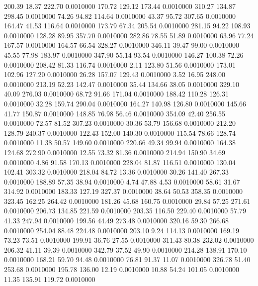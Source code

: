  200.39   18.37  222.70   0.0010000
 170.72  129.12  173.44   0.0010000
 310.27  134.87  298.45   0.0010000
  74.26   94.82  114.64   0.0010000
  43.37   95.72  307.65   0.0010000
 164.47   41.53  116.64   0.0010000
 173.79   67.34  205.54   0.0010000
 281.15   94.22  108.93   0.0010000
 128.28   89.95  357.70   0.0010000
 282.86   78.55   51.89   0.0010000
  63.96   77.24  167.57   0.0010000
 164.57   66.54  328.27   0.0010000
 346.11   39.47   99.00   0.0010000
  45.55   77.98  183.97   0.0010000
 347.90   55.14   93.54   0.0010000
 146.27  100.38   72.26   0.0010000
 208.42   81.33  116.74   0.0010000
   2.11  123.80   51.56   0.0010000
 173.01  102.96  127.20   0.0010000
  26.28  157.07  129.43   0.0010000
   3.52   16.95  248.00   0.0010000
 213.19   52.23  142.47   0.0010000
  35.44  134.66   38.05   0.0010000
 329.10   40.09  276.03   0.0010000
  68.72   91.66  171.04   0.0010000
 188.42  110.28  126.31   0.0010000
  32.28  159.74  290.04   0.0010000
 164.27  140.98  126.80   0.0010000
 145.66   41.77  150.87   0.0010000
 148.85   76.98   56.46   0.0010000
 354.09   42.40  256.55   0.0010000
  72.57   81.52  307.23   0.0010000
  30.36   53.79  156.68   0.0010000
 212.20  128.79  240.37   0.0010000
 122.43  152.00  140.30   0.0010000
 115.54   78.66  128.74   0.0010000
  11.38   50.57  149.60   0.0010000
 220.66   49.34   99.94   0.0010000
 164.38  124.68  272.90   0.0010000
  12.55   73.32   81.36   0.0010000
 214.94  150.90   34.69   0.0010000
   4.86   91.58  170.13   0.0010000
 228.04   81.87  116.51   0.0010000
 130.04  102.41  303.32   0.0010000
 218.04   84.72   13.36   0.0010000
  30.26  141.40  267.33   0.0010000
 188.89   57.35   38.94   0.0010000
   4.74   47.88    4.53   0.0010000
  58.61   31.67  314.92   0.0010000
 183.33  127.19  327.37   0.0010000
  38.64   50.53  358.35   0.0010000
 323.45  162.25  264.42   0.0010000
 181.26   45.68  160.75   0.0010000
  29.84   57.25  271.61   0.0010000
 206.73  134.85  221.59   0.0010000
 203.35  116.50  229.40   0.0010000
  57.79   41.33  247.94   0.0010000
 199.56   44.49  273.48   0.0010000
 320.16   59.30  266.68   0.0010000
 254.04   88.48  224.48   0.0010000
 203.10    9.24  114.13   0.0010000
 169.19   73.23   73.51   0.0010000
 199.91   36.76   27.55   0.0010000
 311.43   80.38  232.02   0.0010000
 206.32   41.11   39.39   0.0010000
 342.79   37.52   49.90   0.0010000
 214.28  138.91  170.10   0.0010000
 168.21   59.70   94.48   0.0010000
  76.81   91.37   11.07   0.0010000
 326.78   51.40  253.68   0.0010000
 195.78  136.00   12.19   0.0010000
  10.88   54.24  101.05   0.0010000
  11.35  135.91  119.72   0.0010000
